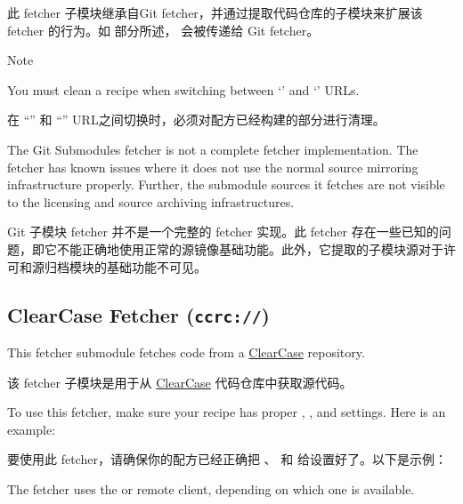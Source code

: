 此 fetcher 子模块继承自Git fetcher，并通过提取代码仓库的子模块来扩展该 fetcher 的行为。如  部分所述， 会被传递给 Git fetcher。

\medskip
\begin{noteblock}{Note}%

You must clean a recipe when switching between `' and `' URLs.

\medskip
在 ``'' 和 ``'' URL之间切换时，必须对配方已经构建的部分进行清理。

\medskip
The Git Submodules fetcher is not a complete fetcher implementation. The fetcher has known issues where it does not use the normal source mirroring infrastructure properly. Further, the submodule sources it fetches are not visible to the licensing and source archiving infrastructures.

\medskip
Git 子模块 fetcher 并不是一个完整的 fetcher 实现。此 fetcher 存在一些已知的问题，即它不能正确地使用正常的源镜像基础功能。此外，它提取的子模块源对于许可和源归档模块的基础功能不可见。
\end{noteblock}

\subsection{ClearCase Fetcher (\texttt{ccrc://})}

This fetcher submodule fetches code from a \href{http://en.wikipedia.org/wiki/Rational_ClearCase}{ClearCase} repository.

该 fetcher 子模块是用于从 \href{http://en.wikipedia.org/wiki/Rational_ClearCase}{ClearCase} 代码仓库中获取源代码。

To use this fetcher, make sure your recipe has proper , , and  settings. Here is an example:

要使用此 fetcher，请确保你的配方已经正确把 、 和  给设置好了。以下是示例：


The fetcher uses the  or  remote client, depending on which one is available.

